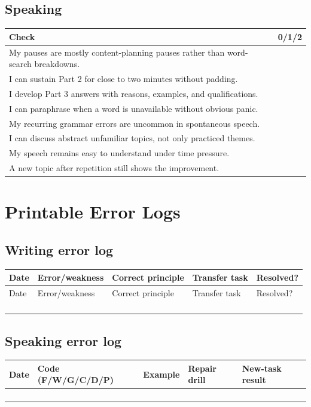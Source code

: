 \documentclass[11pt,a4paper]{article}
\begin{document}
\subsection{Speaking}
\begin{longtable}{p{}p{}}
\toprule
Check & 0/1/2 \\
\midrule
My pauses are mostly content-planning pauses rather than word-search breakdowns. & \\
I can sustain Part 2 for close to two minutes without padding. & \\
I develop Part 3 answers with reasons, examples, and qualifications. & \\
I can paraphrase when a word is unavailable without obvious panic. & \\
My recurring grammar errors are uncommon in spontaneous speech. & \\
I can discuss abstract unfamiliar topics, not only practiced themes. & \\
My speech remains easy to understand under time pressure. & \\
A new topic after repetition still shows the improvement. & \\
\bottomrule
\end{longtable}

\section{Printable Error Logs}

\subsection{Writing error log}
\begin{longtable}{p{2cm}p{3.1cm}p{3.1cm}p{3.4cm}p{2.2cm}}
\toprule
Date & Error/weakness & Correct principle & Transfer task & Resolved? \\
\midrule
\endfirsthead
\toprule
Date & Error/weakness & Correct principle & Transfer task & Resolved? \\
\midrule
\endhead
& & & & \\
\addlinespace[8mm]
& & & & \\
\addlinespace[8mm]
& & & & \\
\addlinespace[8mm]
& & & & \\
\bottomrule
\end{longtable}

\subsection{Speaking error log}
\begin{longtable}{p{2cm}p{2.2cm}p{3cm}p{3.5cm}p{2.6cm}}
\toprule
Date & Code (F/W/G/C/D/P) & Example & Repair drill & New-task result \\
\midrule
& & & & \\
\addlinespace[8mm]
& & & & \\
\addlinespace[8mm]
& & & & \\
\addlinespace[8mm]
& & & & \\
\bottomrule
\end{longtable}
\end{document}
